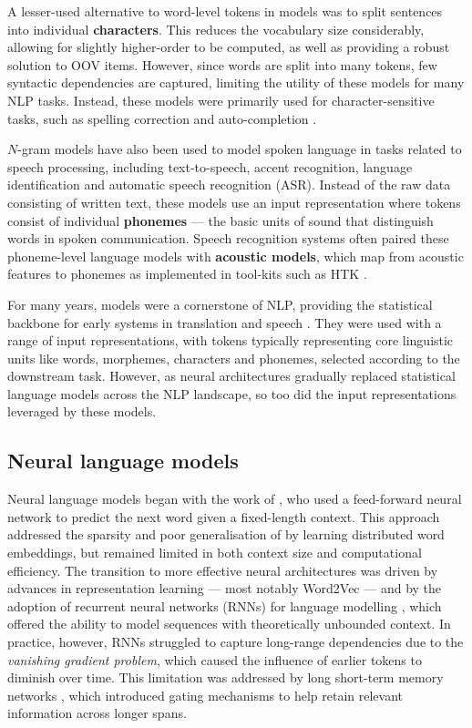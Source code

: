 A lesser-used alternative to word-level tokens in \ngram models was to split sentences into individual \textbf{characters}. This reduces the vocabulary size considerably, allowing for slightly higher-order \ngrams to be computed, as well as providing a robust solution to OOV items. However, since words are split into many tokens, few syntactic dependencies are captured, limiting the utility of these models for many NLP tasks. Instead, these models were primarily used for character-sensitive tasks, such as spelling correction and auto-completion \citep{cucerzan_spelling_2004}.

$N$-gram models have also been used to model spoken language in tasks related to speech processing, including text-to-speech, accent recognition, language identification and automatic speech recognition (ASR). Instead of the raw data consisting of written text, these models use an input representation where tokens consist of individual \textbf{phonemes} --- the basic units of sound that distinguish words in spoken communication. Speech recognition systems often paired these phoneme-level language models with \textbf{acoustic models}, which map from acoustic features to phonemes as implemented in tool-kits such as HTK \citep{young2006htk}.

For many years, \ngram models were a cornerstone of NLP, providing the statistical backbone for early systems in translation and speech \citep{jurafsky2009speech}. They were used with a range of input representations, with tokens typically representing core linguistic units like words, morphemes, characters and phonemes, selected according to the downstream task. However, as neural architectures gradually replaced statistical language models across the NLP landscape, so too did the input representations leveraged by these models.

\subsection{Neural language models}

Neural language models began with the work of \citet{bengio2003neural}, who used a feed-forward neural network to predict the next word given a fixed-length context. This approach addressed the sparsity and poor generalisation of \ngrams by learning distributed word embeddings, but remained limited in both context size and computational efficiency. The transition to more effective neural architectures was driven by advances in representation learning --- most notably Word2Vec \citep{mikolov_distributed_2013} --- and by the adoption of recurrent neural networks (RNNs) for language modelling \citep[RNNLMs;][]{mikolov2010recurrent}, which offered the ability to model sequences with theoretically unbounded context. In practice, however, RNNs struggled to capture long-range dependencies due to the \emph{vanishing gradient problem}, which caused the influence of earlier tokens to diminish over time. This limitation was addressed by long short-term memory networks \citep[LSTMs;][]{sundermeyer2012lstm}, which introduced gating mechanisms to help retain relevant information across longer spans. 


